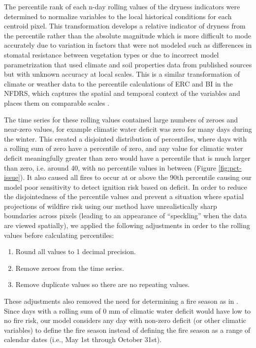 \documentclass[11p]{article}
\begin{document}
The percentile rank of each n-day rolling values of the dryness indicators were determined to normalize variables to the local historical conditions for each centroid pixel. This transformation develops a relative indicator of dryness from the percentile rather than the absolute magnitude which is more difficult to mode accurately due to variation in factors that were not modeled such as differences in stomatal resistance between vegetation types or due to incorrect model parametrization that used climate and soil properties data from published sources but with unknown accuracy at local scales. This is a similar transformation of climate or weather data to the percentile calculations of ERC and BI in the NFDRS, which captures the spatial and temporal context of the variables and places them on comparable scales \citep{jollySevereFireDanger2019}.

The time series for these rolling values contained large numbers of zeroes and near-zero values, for example climatic water deficit was zero for many days during the winter. This created a disjointed distribution of percentiles, where days with a rolling sum of zero have a percentile of zero, and any value for climatic water deficit meaningfully greater than zero would have a percentile that is much larger than zero, i.e. around 40, with no percentile values in between (Figure \ref{fig:pct-issue}). It also caused all fires to occur at or above the 90th percentile causing our model poor sensitivity to detect ignition risk based on deficit. In order to reduce the disjointedness of the percentile values and prevent a situation where spatial projections of wildfire risk using our method have unrealistically sharp boundaries across pixels (leading to an appearance of ``speckling'' when the data are viewed spatially), we applied the following adjustments in order to the rolling values before calculating percentiles:

\begin{enumerate}
\item Round all values to 1 decimal precision.
\item Remove zeroes from the time series.
\item Remove duplicate values so there are no repeating values.
\end{enumerate}
   
These adjustments %
also removed the need for determining a fire season as in \citet{thomaWaterBalanceIndicator2020}. Since days with a rolling sum of 0 mm of climatic water deficit would have low to no fire risk, our model considers any day with non-zero deficit (or other climatic variables) to define the fire season instead of defining the fire season as a range of calendar dates (i.e., May 1st through October 31st).
\end{document}
